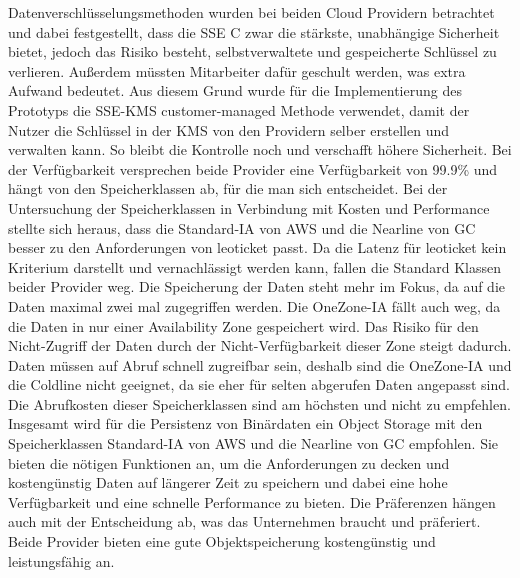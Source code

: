  Datenverschlüsselungsmethoden wurden bei beiden Cloud Providern betrachtet und dabei festgestellt, dass die SSE C zwar die stärkste, unabhängige Sicherheit bietet, jedoch das Risiko besteht, selbstverwaltete und gespeicherte Schlüssel zu verlieren. Außerdem müssten Mitarbeiter dafür geschult werden, was extra Aufwand bedeutet. Aus diesem Grund wurde für die Implementierung des Prototyps die SSE-KMS customer-managed Methode verwendet, damit der Nutzer die Schlüssel in der KMS von den Providern selber erstellen und verwalten kann. So bleibt die Kontrolle noch und verschafft höhere Sicherheit. Bei der Verfügbarkeit versprechen beide Provider eine Verfügbarkeit von 99.9\% und hängt von den Speicherklassen ab, für die man sich entscheidet. Bei der Untersuchung der Speicherklassen in Verbindung mit Kosten und Performance stellte sich heraus, dass die Standard-IA von AWS und die Nearline von GC besser zu den Anforderungen von leoticket passt. Da die Latenz für leoticket kein Kriterium darstellt und vernachlässigt werden kann, fallen die Standard Klassen beider Provider weg. Die Speicherung der Daten steht mehr im Fokus, da auf die Daten maximal zwei mal zugegriffen werden. Die OneZone-IA fällt auch weg, da die Daten in nur einer Availability Zone gespeichert wird. Das Risiko für den Nicht-Zugriff der Daten durch der Nicht-Verfügbarkeit dieser Zone steigt dadurch. Daten müssen auf Abruf schnell zugreifbar sein, deshalb sind die OneZone-IA und die Coldline nicht geeignet, da sie eher für selten abgerufen Daten angepasst sind. Die Abrufkosten dieser Speicherklassen sind am höchsten und nicht zu empfehlen.\\

Insgesamt wird für die Persistenz von Binärdaten ein Object Storage mit den Speicherklassen Standard-IA von AWS und die Nearline von GC empfohlen. Sie bieten die nötigen Funktionen an, um die Anforderungen zu decken und kostengünstig Daten auf längerer Zeit zu speichern und dabei eine hohe Verfügbarkeit und eine schnelle Performance zu bieten. Die Präferenzen hängen auch mit der Entscheidung ab, was das Unternehmen braucht und präferiert. Beide Provider bieten eine gute Objektspeicherung kostengünstig und leistungsfähig an.\\

